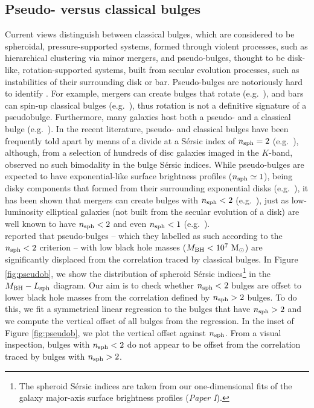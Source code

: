 \documentclass[preprint2]{emulateapj}
\begin{document}
\subsection{Pseudo- versus classical bulges}
Current views distinguish between classical bulges, which are considered to be spheroidal, pressure-supported systems, 
formed through violent processes, such as hierarchical clustering via minor mergers, 
and pseudo-bulges, thought to be disk-like, rotation-supported systems, 
built from secular evolution processes, such as instabilities of their surrounding disk or bar. 
Pseudo-bulges are notoriously hard to identify \citep{graham2013review,graham2014review,graham2015pseudo,graham2015review}.
For example, mergers can create bulges that rotate (e.g.~\citealt{bekki2010,keselmannusser2012}), 
and bars can spin-up classical bulges (e.g.~\citealt{saha2012}), 
thus rotation is not a definitive signature of a pseudobulge. 
Furthermore, many galaxies host both a pseudo- and a classical bulge (e.g.~\citealt{erwin2003,erwin2015,athanassoula2005,Gadotti2009,
macarthur2009,dosanjosdasilva2013,seidel2015}). 
In the recent literature, pseudo- and classical bulges have been frequently told apart by means of a divide at a 
S\'ersic index of $n_{\rm sph}=2$ (e.g.~\citealt{fisherdrory2010}), 
although, from a selection of hundreds of disc galaxies imaged in the $K$-band, 
\cite{grahamworley2008} observed no such bimodality in the bulge S\'ersic indices. 
While pseudo-bulges are expected to have exponential-like surface brightness profiles ($n_{\rm sph} \simeq 1$), 
being disky components that formed from their surrounding exponential disks 
(e.g.~\citealt{bardeen1975,hohl1975,combessanders1981,combes1990,pfennigerfriedli1991}), 
it has been shown that mergers can create bulges with $n_{\rm sph}<2$
(e.g.~\citealt{elichemoral2011,scannapieco2011,querejeta2015}), 
just as low-luminosity elliptical galaxies (not built from the secular evolution of a disk)
are well known to have $n_{\rm sph}<2$ and even $n_{\rm sph}<1$ (e.g.~\citealt{davies1988,youngcurrie1994}). \\
\cite{sani2011} reported that pseudo-bulges -- which they labelled as such according to the $n_{\rm sph}<2$ criterion -- 
with low black hole masses ($M_{\rm BH} < 10^7\rm~M_\odot$) are significantly displaced from the correlation 
traced by classical bulges. 
In Figure \ref{fig:pseudob}, we show the distribution of spheroid S\'ersic indices\footnote{The spheroid S\'ersic indices 
are taken from our one-dimensional fits of the galaxy major-axis surface brightness profiles (\emph{Paper I}).} 
in the $M_{\rm BH} - L_{\rm sph}$ diagram.
Our aim is to check whether $n_{\rm sph}<2$ bulges 
are offset to lower black hole masses from the correlation defined by $n_{\rm sph}>2$ bulges. 
To do this, we fit a symmetrical linear regression to the bulges that have $n_{\rm sph}>2$ 
and we compute the vertical offset of all bulges from the regression. 
In the inset of Figure \ref{fig:pseudob}, we plot the vertical offset against $n_{\rm sph}$. 
From a visual inspection, bulges with $n_{\rm sph}<2$ do not appear to be offset from the correlation traced by bulges with $n_{\rm sph}>2$.
\end{document}
